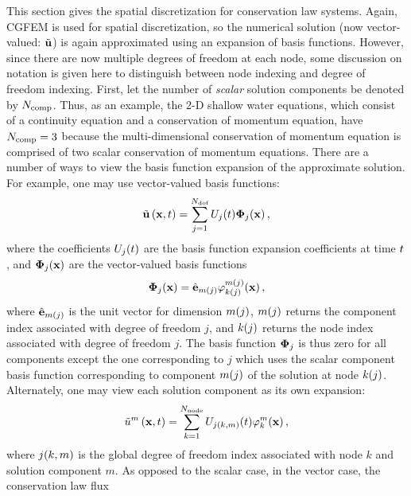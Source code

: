 This section gives the spatial discretization for conservation law systems.
Again, CGFEM is used for
spatial discretization, so the numerical solution (now vector-valued:
$\tilde{\mathbf{u}}$) is again approximated using an expansion of basis
functions. However, since there are now multiple degrees of freedom at each
node, some discussion on notation is given here to distinguish between node
indexing and degree of freedom indexing.  First, let the number of
\emph{scalar} solution components be denoted by $N_\text{comp}$.  Thus, as an
example, the 2-D shallow water equations, which consist of a continuity
equation and a conservation of momentum equation, have $N_\text{comp}=3$ because
the multi-dimensional conservation of momentum equation is comprised of two
scalar conservation of momentum equations.  There are a number of ways to view
the basis function expansion of the approximate solution. For example, one may
use vector-valued basis functions:
\begin{equation}
  \tilde{\mathbf{u}}\left(\mathbf{x},t\right) = \sum\limits_{j=1}^{N_\text{dof}}
    U_j(t)\mathbf{\Phi}_j(\mathbf{x}) \,,
\end{equation}
where the coefficients $U_j(t)$ are the basis function
expansion coefficients at time $t$, and $\mathbf{\Phi}_j(\mathbf{x})$
are the vector-valued basis functions
\begin{equation}
  \mathbf{\Phi}_j(\mathbf{x}) = 
    \hat{\mathbf{e}}_{m(j)}
      \varphi^{m(j)}_{k(j)}(\mathbf{x})
  \,,
\end{equation}
where $\hat{\mathbf{e}}_{m(j)}$ is the unit vector for dimension
$m(j)$, $m(j)$ returns the component index associated with degree
of freedom $j$, and $k(j)$ returns the node index associated with
degree of freedom $j$. The basis function $\mathbf{\Phi}_j$ is thus
zero for all components except the one corresponding to $j$ which uses
the scalar component basis function corresponding to component $m(j)$ of
the solution at node $k(j)$.
Alternately, one may view each solution component as its own expansion:
\begin{equation}
  \tilde{u}^m\left(\mathbf{x},t\right) = \sum\limits_{k=1}^{N_\text{node}}
    U_{j(k,m)}(t)\varphi^m_k(\mathbf{x})
  \,,
\end{equation}
where $j(k,m)$ is the global degree of freedom index associated
with node $k$ and solution component $m$.
As opposed to the scalar case, in the vector case, the conservation law flux
